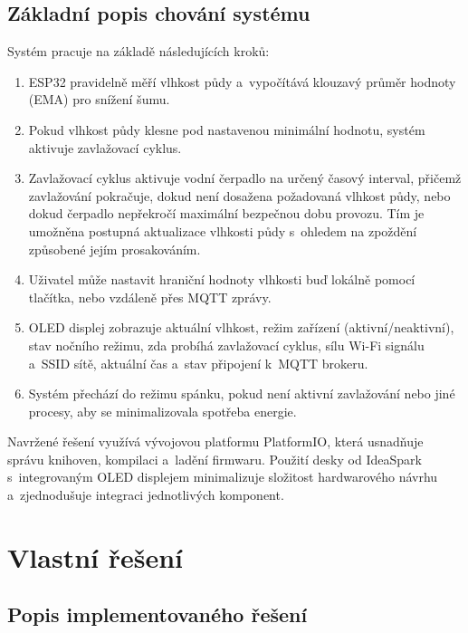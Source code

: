 \documentclass[a4paper, 11pt]{article}
\begin{document}
\subsection{Základní popis chování systému}

Systém pracuje na základě následujících kroků:
\begin{enumerate}
    \item ESP32 pravidelně měří vlhkost půdy a~vypočítává klouzavý průměr hodnoty (EMA) pro snížení šumu.
    \item Pokud vlhkost půdy klesne pod nastavenou minimální hodnotu, systém aktivuje zavlažovací cyklus.
    \item Zavlažovací cyklus aktivuje vodní čerpadlo na určený časový interval, přičemž zavlažování pokračuje, dokud není dosažena požadovaná vlhkost půdy, nebo dokud čerpadlo nepřekročí maximální bezpečnou dobu provozu. Tím je umožněna postupná aktualizace vlhkosti půdy s~ohledem na zpoždění způsobené jejím prosakováním.
    \item Uživatel může nastavit hraniční hodnoty vlhkosti buď lokálně pomocí tlačítka, nebo vzdáleně přes MQTT zprávy.
    \item OLED displej zobrazuje aktuální vlhkost, režim zařízení (aktivní/neaktivní), stav nočního režimu, zda probíhá zavlažovací cyklus, sílu Wi-Fi signálu a~SSID sítě, aktuální čas a~stav připojení k~MQTT brokeru. 
    \item Systém přechází do režimu spánku, pokud není aktivní zavlažování nebo jiné procesy, aby se minimalizovala spotřeba energie.
\end{enumerate}

Navržené řešení využívá vývojovou platformu PlatformIO, která usnadňuje správu knihoven, kompilaci a~ladění firmwaru. 
Použití desky od IdeaSpark s~integrovaným OLED displejem minimalizuje složitost hardwarového návrhu a~zjednodušuje integraci jednotlivých komponent.

\section{Vlastní řešení}

\subsection{Popis implementovaného řešení}
\end{document}
